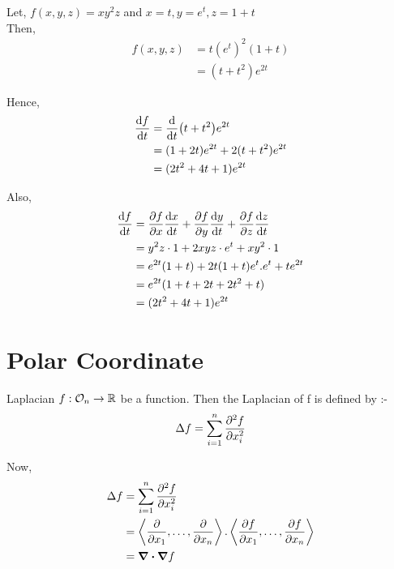 \documentclass[../Analysis-3.tex]{subfiles}
\begin{document}
\begin{Eg}{}{}
  Let, $f(x,y,z) = xy^{2}z$ and $x=t, y=e^t, z= 1+t$ \\
  Then, \begin{align*}
    f(x,y,z) & = t(e^t)^2(1+t) \\
             & = (t+t^2)e^{2t}
  \end{align*}

  Hence, \begin{align*}
    \dv{f}{t} & = \dv{t}(t+t^2)e^{2t}           \\
              & = (1+2t)e^{2t} + 2(t+t^2)e^{2t} \\
              & = (2t^2+4t+1)e^{2t}
  \end{align*}

  Also, \begin{align*}
    \dv{f}{t} & = \pdv{f}{x} \dv{x}{t} + \pdv{f}{y} \dv{y}{t} + \pdv{f}{z} \dv{z}{t} \\
              & = y^2z\cdot 1 + 2xyz\cdot e^t + xy^2\cdot 1                          \\
              & = e^{2t}(1+t) + 2t(1+t)e^t.e^t + te^{2t}                             \\
              & = e^{2t}(1+t+2t+2t^2+t)                                              \\
              & = (2t^2+4t+1)e^{2t}
  \end{align*}
\end{Eg}


\section{Polar Coordinate}

\begin{Def}{Laplacian}{}
  $f : \mathcal{O}_{n} \to \mathbb{R}$ be a function. Then the Laplacian of f is defined by :- \[ \Delta f = \sum_{i = 1}^{n} \pdv[2]{f}{x_i}   \]
\end{Def}

Now, \begin{align*}
  \Delta f & = \sum_{i=1}^{n} \pdv[2]{f}{x_i}                                                                                               \\
           & = \left\langle \pdv{}{x_1}, \ldots, \pdv{}{x_n}  \right\rangle. \left\langle \pdv{f}{x_1}, \ldots, \pdv{f}{x_n}  \right\rangle \\
           & = \div\grad f
\end{align*}
\end{document}
